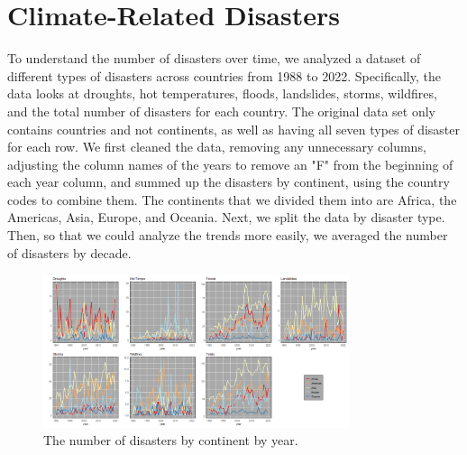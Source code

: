 \documentclass[10pt]{article}
\begin{document}
\section{Climate-Related Disasters}  
\label{Disasters}
To understand the number of disasters over time, we analyzed a dataset of different types of disasters across countries from 1988 to 2022. Specifically, the data looks at droughts, hot temperatures, floods, landslides, storms, wildfires, and the total number of disasters for each country. The original data set only contains countries and not continents, as well as having all seven types of disaster for each row. We first cleaned the data, removing any unnecessary columns, adjusting the column names of the years to remove an "F" from the beginning of each year column, and summed up the disasters by continent, using the country codes to combine them. The continents that we divided them into are Africa, the Americas, Asia, Europe, and Oceania. Next, we split the data by disaster type. Then, so that we could analyze the trends more easily, we averaged the number of disasters by decade.

\begin{figure}[H]
    \centering
    \includegraphics[width=0.8\textwidth]{Continent_Disasters.png}
    \caption{The number of disasters by continent by year.}
    \label{fig:disast_year}
\end{figure}
\end{document}
